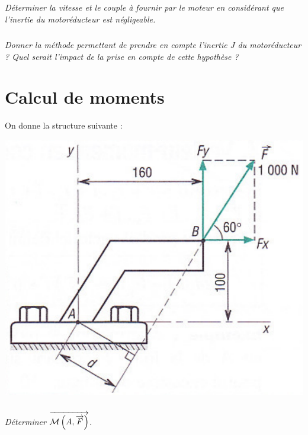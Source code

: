 \documentclass[10pt,fleqn]{article} %
\begin{document}
\begin{multicols}{2}
\subparagraph{}
\textit{Déterminer la vitesse et le couple à fournir par le moteur en considérant que l'inertie du motoréducteur est négligeable. }
\ifprof
\begin{corrige}
\end{corrige}
\else
\fi


\subparagraph{}
\textit{Donner la méthode permettant de prendre en compte l'inertie $J$ du motoréducteur ? Quel serait l'impact de la prise en compte de cette hypothèse ? }
\ifprof
\begin{corrige}
\end{corrige}
\else
\fi


\section*{Calcul de moments}

\setcounter{exo}{0}
On donne la structure suivante : 
\begin{center}
\includegraphics[width=.8\linewidth]{images/fig_21}
\end{center}


\subparagraph{}
\textit{Déterminer $\overrightarrow{\mathcal{M}\left(A,\overrightarrow{F} \right)}$.}




\end{multicols}
\end{document}
